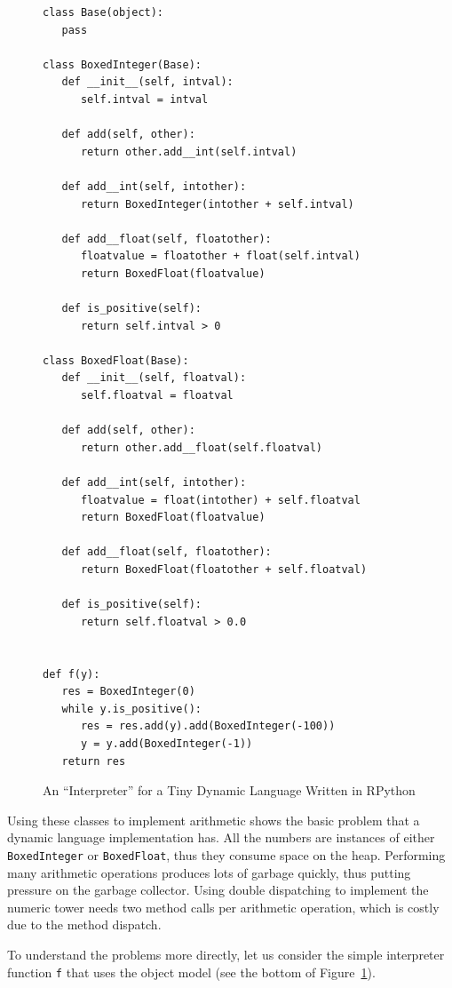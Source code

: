 \documentclass[preprint]{sigplanconf}
\begin{document}
\begin{figure}
\begin{lstlisting}[mathescape]
class Base(object):
   pass

class BoxedInteger(Base):
   def __init__(self, intval):
      self.intval = intval

   def add(self, other):
      return other.add__int(self.intval)

   def add__int(self, intother):
      return BoxedInteger(intother + self.intval)

   def add__float(self, floatother):
      floatvalue = floatother + float(self.intval)
      return BoxedFloat(floatvalue)

   def is_positive(self):
      return self.intval > 0

class BoxedFloat(Base):
   def __init__(self, floatval):
      self.floatval = floatval

   def add(self, other):
      return other.add__float(self.floatval)

   def add__int(self, intother):
      floatvalue = float(intother) + self.floatval
      return BoxedFloat(floatvalue)

   def add__float(self, floatother):
      return BoxedFloat(floatother + self.floatval)

   def is_positive(self):
      return self.floatval > 0.0


def f(y):
   res = BoxedInteger(0)
   while y.is_positive():
      res = res.add(y).add(BoxedInteger(-100))
      y = y.add(BoxedInteger(-1))
   return res
\end{lstlisting}
\caption{An ``Interpreter'' for a Tiny Dynamic Language Written in RPython}
\label{fig:objmodel}
\end{figure}

Using these classes to implement arithmetic shows the basic problem that a
dynamic language implementation has. All the numbers are instances of either
\lstinline{BoxedInteger} or \lstinline{BoxedFloat}, thus they consume space on the
heap. Performing many arithmetic operations produces lots of garbage quickly,
thus putting pressure on the garbage collector. Using double dispatching to
implement the numeric tower needs two method calls per arithmetic operation,
which is costly due to the method dispatch.

To understand the problems more directly, let us consider the simple
interpreter function \lstinline{f} that uses the object model (see the bottom of
Figure~\ref{fig:objmodel}).
\end{document}
